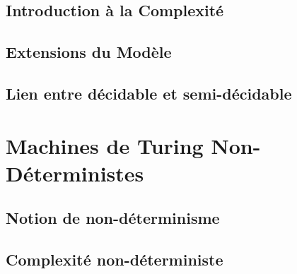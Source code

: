 \documentclass[9pt, handout]{beamer}
\begin{document}
\subsection{Introduction à la Complexité}







 
\subsection{Extensions du Modèle}





 
\subsection{Lien entre décidable et semi-décidable}

 
\section{Machines de Turing Non-Déterministes}
 
\subsection{Notion de non-déterminisme}






 
\subsection{Complexité non-déterministe}




 
\end{document}
